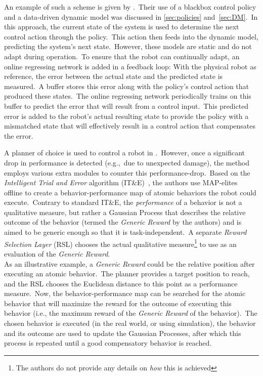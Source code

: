 An example of such a scheme is given by \textcite{Nazeer2023} .\ Their use of a blackbox control policy and a data-driven dynamic model was discussed in \cref{sec:policies} and~\ref{sec:DM}.\ In this approach, the current state of the system is used to determine the next control action through the policy.\ This action then feeds into the dynamic model, predicting the system's next state.\ However, these models are static and do not adapt during operation.\ To ensure that the robot can continually adapt, an online regressing network is added in a feedback loop: With the physical robot as reference, the error between the actual state and the predicted state is measured.\ A buffer stores this error along with the policy's control action that produced these states.\ The online regressing network periodically trains on this buffer to predict the error that will result from a control input.\ This predicted error is added to the robot's actual resulting state to provide the policy with a mismatched state that will effectively result in a control action that compensates the error.

A planner of choice is used to control a robot in \textcite{Chatzilygeroudis2016}.\ However, once a significant drop in performance is detected (e.g.,\ due to unexpected damage), the method employs various extra modules to counter this performance-drop.\ Based on the \emph{Intelligent Trial and Error} algorithm (IT\&E)~\cite{Cully2015}, the authors use MAP-elites~\cite[refer to ]{Mouret2015} offline to create a behavior-performance map of atomic behaviors the robot could execute.\ Contrary to standard IT\&E, the \emph{performance} of a behavior is not a qualitative measure, but rather a Gaussian Process that describes the relative outcome of the behavior (termed the \emph{Generic Reward} by the authors) and is aimed to be generic enough so that it is task-independent.\ A separate \emph{Reward Selection Layer} (RSL) chooses the actual qualitative measure\footnote{The authors do not provide any details on \emph{how} this is achieved} to use as an evaluation of the \emph{Generic Reward}.\\
As an illustrative example, a \emph{Generic Reward} could be the relative position after executing an atomic behavior.\ The planner provides a target position to reach, and the RSL chooses the Euclidean distance to this point as a performance measure.\ Now, the behavior-performance map can be searched for the atomic behavior that will maximize the reward for the outcome of executing this behavior (i.e., the maximum reward of the \emph{Generic Reward} of the behavior).\ The chosen behavior is executed (in the real world, or using simulation), the behavior and its outcome are used to update the Gaussian Processes, after which this process is repeated until a good compensatory behavior is reached.

